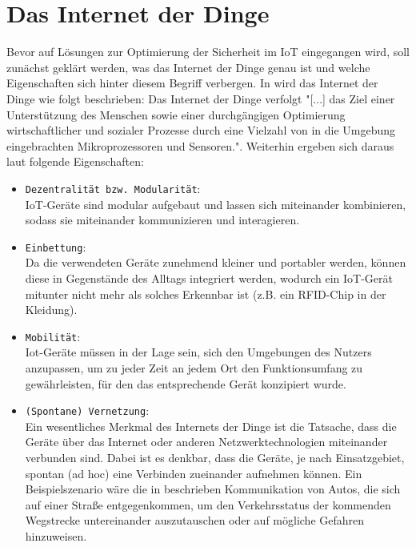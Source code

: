 \documentclass[conference]{IEEEtran}
\begin{document}
\section{Das Internet der Dinge}
Bevor auf Lösungen zur Optimierung der Sicherheit im IoT eingegangen wird, soll zunächst geklärt werden, was das Internet der Dinge genau ist und welche Eigenschaften sich hinter diesem Begriff verbergen. In \cite{fried} wird das Internet der Dinge wie folgt beschrieben: Das Internet der Dinge verfolgt "[...] das Ziel einer Unterstützung des Menschen sowie einer durchgängigen Optimierung wirtschaftlicher und sozialer Prozesse durch eine Vielzahl von in die Umgebung eingebrachten Mikroprozessoren und Sensoren.". Weiterhin ergeben sich daraus laut \cite{fried} folgende Eigenschaften:
\begin{itemize}
  \item \texttt{Dezentralität bzw. Modularität}: \\
  IoT-Geräte sind modular aufgebaut und lassen sich miteinander kombinieren, sodass sie miteinander kommunizieren und interagieren. \newline
  \item \texttt{Einbettung}: \\
  Da die verwendeten Geräte zunehmend kleiner und portabler werden, können diese in Gegenstände des Alltags integriert werden, wodurch ein IoT-Gerät mitunter nicht mehr als solches Erkennbar ist (z.B. ein RFID-Chip in der Kleidung). \newline
  \item \texttt{Mobilität}: \\
  Iot-Geräte müssen in der Lage sein, sich den Umgebungen des Nutzers anzupassen, um zu jeder Zeit an jedem Ort den Funktionsumfang zu gewährleisten, für den das entsprechende Gerät konzipiert wurde. \newline
  \item \texttt{(Spontane) Vernetzung}: \\
  Ein wesentliches Merkmal des Internets der Dinge ist die Tatsache, dass die Geräte über das Internet oder anderen Netzwerktechnologien miteinander verbunden sind. Dabei ist es denkbar, dass die Geräte, je nach Einsatzgebiet, spontan (ad hoc) eine Verbinden zueinander aufnehmen können. Ein Beispielszenario wäre die in \cite{adhoc} beschrieben Kommunikation von Autos, die sich auf einer Straße entgegenkommen, um den Verkehrsstatus der kommenden Wegstrecke untereinander auszutauschen oder auf mögliche Gefahren hinzuweisen. \newline

\end{itemize}
\end{document}

